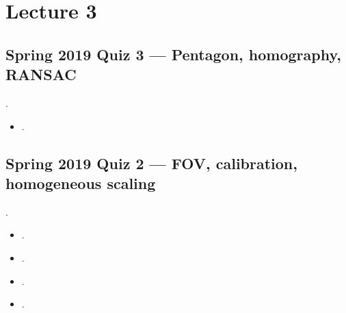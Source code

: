 \documentclass[letterpaper,11pt,english,openany,oneside]{jupyterBook}
\begin{document}
\section{Lecture 3}
\label{\detokenize{reference/quiz-index:lecture-3}}
\sphinxAtStartPar
{}


\subsection{Spring 2019 Quiz 3 — Pentagon, homography, RANSAC}
\label{\detokenize{reference/quiz-index:spring-2019-quiz-3-pentagon-homography-ransac}}
\sphinxAtStartPar
{} .
\begin{itemize}
\item {}
\sphinxAtStartPar
{\hyperref[\detokenize{lectures/lecture03/quiz-workbook:quiz-7-q1}]{}}.

\end{itemize}


\subsection{Spring 2019 Quiz 2 — FOV, calibration, homogeneous scaling}
\label{\detokenize{reference/quiz-index:spring-2019-quiz-2-fov-calibration-homogeneous-scaling}}
\sphinxAtStartPar
{} .
\begin{itemize}
\item {}
\sphinxAtStartPar
{\hyperref[\detokenize{lectures/lecture03/quiz-workbook:quiz-10-q1}]{}}.

\item {}
\sphinxAtStartPar
{\hyperref[\detokenize{lectures/lecture03/quiz-workbook:quiz-10-q2}]{}}.

\item {}
\sphinxAtStartPar
{\hyperref[\detokenize{lectures/lecture03/quiz-workbook:quiz-10-q3}]{}}.

\item {}
\sphinxAtStartPar
{\hyperref[\detokenize{lectures/lecture03/quiz-workbook:quiz-10-q4}]{}}.

\end{itemize}
\end{document}
